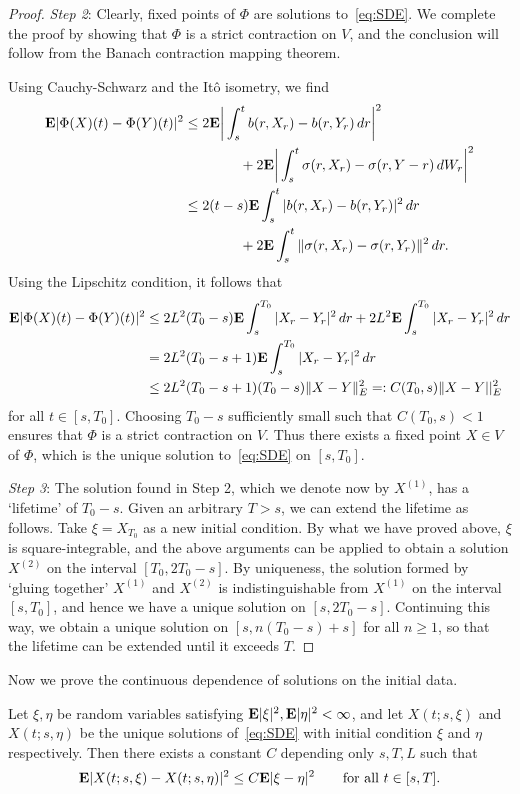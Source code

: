 \begin{proof}
	\emph{Step 2}: Clearly, fixed points of $\Phi$ are solutions to~\eqref{eq:SDE}. We complete the proof by showing that $\Phi$ is a strict contraction on $V$, and the conclusion will follow from the Banach contraction mapping theorem.
	
	Using Cauchy-Schwarz and the It\^{o} isometry, we find
	\begin{align*}
		\mathbf{E}|\Phi(X)(t)-\Phi(Y)(t)|^2 &\le 2\mathbf{E}\bigg|\int_s^t b(r,X_r)-b(r,Y_r)\,dr\bigg|^2 \\
		&\qquad\qquad + 2\mathbf{E}\bigg|\int_s^t \sigma(r,X_r)-\sigma(r,Y-r)\,dW_r\bigg|^2 \\
		&\le 2(t-s)\mathbf{E}\int_s^t|b(r,X_r)-b(r,Y_r)|^2\,dr \\
		&\qquad\qquad + 2\mathbf{E}\int_s^t \|\sigma(r,X_r)-\sigma(r,Y_r)\|^2\,dr.
	\end{align*}
	Using the Lipschitz condition, it follows that
	\begin{align*}
		\mathbf{E}|\Phi(X)(t)-\Phi(Y)(t)|^2 &\le 2L^2(T_0-s)\mathbf{E}\int_s^{T_0}|X_r-Y_r|^2\,dr + 2L^2\mathbf{E}\int_s^{T_0}|X_r-Y_r|^2\,dr \\
		&= 2L^2(T_0-s+1)\mathbf{E}\int_s^{T_0}|X_r-Y_r|^2\,dr \\
		&\le 2L^2(T_0-s+1)(T_0-s)\|X-Y\|^2_E =:C(T_0,s)\|X-Y||^2_E
	\end{align*}
	for all $t\in [s,T_0]$. Choosing $T_0-s$ sufficiently small such that $C(T_0,s)<1$ ensures that $\Phi$ is a strict contraction on $V$. Thus there exists a fixed point $X\in V$ of $\Phi$, which is the unique solution to~\eqref{eq:SDE} on $[s,T_0]$.
	
	\emph{Step 3}: The solution found in Step 2, which we denote now by $X^{(1)}$, has a `lifetime' of $T_0-s$. Given an arbitrary $T>s$, we can extend the lifetime as follows. Take $\xi=X_{T_0}$ as a new initial condition. By what we have proved above, $\xi$ is square-integrable, and the above arguments can be applied to obtain a solution $X^{(2)}$ on the interval $[T_0,2T_0-s]$. By uniqueness, the solution formed by `gluing together' $X^{(1)}$ and $X^{(2)}$ is indistinguishable from $X^{(1)}$ on the interval $[s,T_0]$, and hence we have a unique solution on $[s,2T_0-s]$. Continuing this way, we obtain a unique solution on $[s,n(T_0-s)+s]$ for all $n\ge 1$, so that the lifetime can be extended until it exceeds $T$.
\end{proof}

Now we prove the continuous dependence of solutions on the initial data.
\begin{proposition}
	\label{prop:cont-dependence-initial}
	Let $\xi, \eta$ be random variables satisfying $\mathbf{E}|\xi|^2, \mathbf{E}|\eta|^2 < \infty$, and let $X(t;s,\xi)$ and $X(t;s,\eta)$ be the unique solutions of~\eqref{eq:SDE} with initial condition $\xi$ and $\eta$ respectively. Then there exists a constant $C$ depending only $s,T,L$ such that
	\begin{equation}
		\mathbf{E} |X(t;s,\xi) - X(t;s,\eta)|^2 \le C \mathbf{E}|\xi-\eta|^2 \qquad \text{for all } t \in [s, T].
	\end{equation}
\end{proposition}

